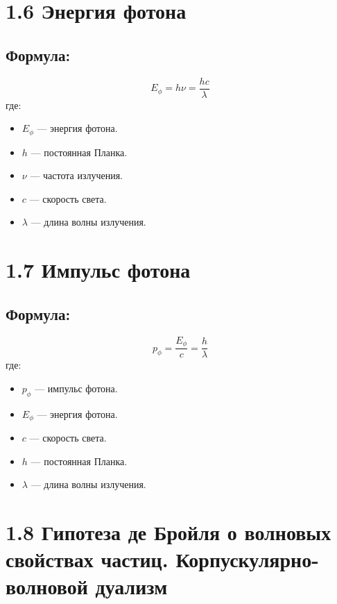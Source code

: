 \documentclass[a4paper,12pt]{article}
\begin{document}
\section*{1.6 Энергия фотона}
\vspace{-9pt}
\subsection*{Формула:}
\vspace{-3pt}
\vspace{-0.05em}
$$ E_{\phi} = h\nu = \frac{hc}{\lambda} $$
где:
\begin{itemize}[itemsep=0pt, topsep=0pt, parsep=3pt]
    \item $E_{\phi}$ — энергия фотона.
    \item $h$ — постоянная Планка.
    \item $\nu$ — частота излучения.
    \item $c$ — скорость света.
    \item $\lambda$ — длина волны излучения.
\end{itemize}

\section*{1.7 Импульс фотона}
\vspace{-9pt}
\subsection*{Формула:}
\vspace{-3pt}
\vspace{-0.05em}
$$ p_{\phi} = \frac{E_{\phi}}{c} = \frac{h}{\lambda} $$
где:
\begin{itemize}[itemsep=0pt, topsep=0pt, parsep=3pt]
    \item $p_{\phi}$ — импульс фотона.
    \item $E_{\phi}$ — энергия фотона.
    \item $c$ — скорость света.
    \item $h$ — постоянная Планка.
    \item $\lambda$ — длина волны излучения.
\end{itemize}

\newpage
\section*{1.8 Гипотеза де Бройля о волновых свойствах частиц. Корпускулярно-волновой дуализм}
\vspace{-9pt}
\end{document}
